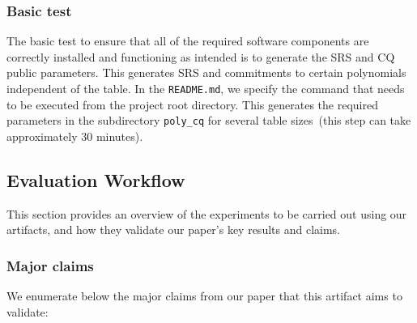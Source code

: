 \documentclass[sigconf]{acmart}
\begin{document}
	
	
	\subsubsection{Basic test}\label{sec:basic}
	

	The basic test to ensure that all of the required software components are correctly installed and functioning as intended is to generate the SRS and CQ public parameters. This generates SRS and commitments to certain polynomials independent of the table. In the {\tt README.md}, we specify the command that needs to be executed from the project root directory. This generates the required parameters in the subdirectory \texttt{poly\_cq} for several table sizes~(this step can take approximately 30 minutes).

	
	
	
	\subsection{Evaluation Workflow}
	
	This section provides an overview of the experiments to be carried out using our artifacts, and how they validate our paper's key results and
	claims.
	
	
	
	\subsubsection{Major claims} We enumerate below the major claims from our paper that this artifact aims to validate: 
	
\end{document}

